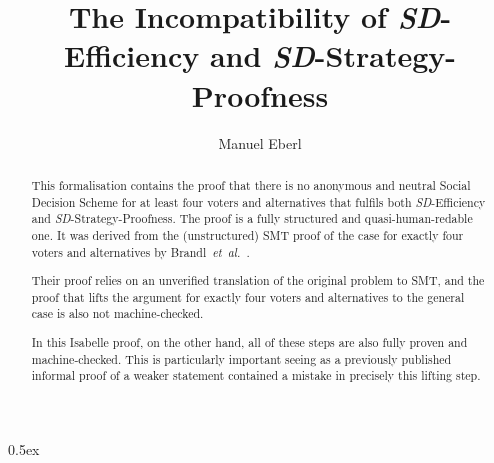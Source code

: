 \documentclass[11pt,a4paper]{article}
\begin{document}
\title{The Incompatibility of \textit{SD}-Efficiency and \textit{SD}-Strategy-Proofness}
\author{Manuel Eberl}
\maketitle

\begin{abstract}
This formalisation contains the proof that there is no anonymous and neutral Social Decision Scheme for at least four voters and alternatives that fulfils both \textit{SD}-Efficiency and \textit{SD}-Strategy-Proofness. The proof is a fully structured and quasi-human-redable one. It was derived from the (unstructured) SMT proof of the case for exactly four voters and alternatives by Brandl\ \textit{et~al.}~\cite{smt}.

Their proof relies on an unverified translation of the original problem to SMT, and the proof that lifts the argument for exactly four voters and alternatives to the general case is also not machine-checked.

In this Isabelle proof, on the other hand, all of these steps are also fully proven and machine-checked. This is particularly important seeing as a previously published informal proof of a weaker statement contained a mistake in precisely this lifting step.~\cite{extendrd}
\end{abstract}

\tableofcontents

\parindent 0pt\parskip 0.5ex
\newpage





\end{document}
